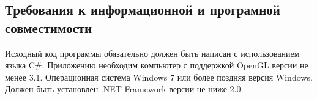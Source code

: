 \subsection{Требования к информационной и програмной совместимости}
Исходный код программы обязательно должен быть написан с использованием языка C\#. Приложению необходим компьютер с поддержкой OpenGL версии не менее 3.1. Операционная система Windows 7 или более поздняя версия Windows. Должен быть установлен .NET Framework версии не ниже 2.0.

